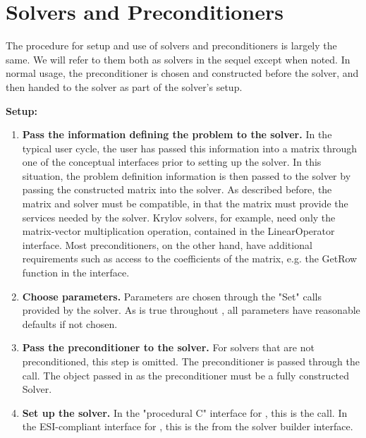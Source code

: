 \chapter{Solvers and Preconditioners}
\label{solvers}

The procedure for setup and use of solvers and preconditioners is largely
the same. We will refer to them both as solvers in the sequel except when noted. 
In normal usage, 
the preconditioner is chosen and constructed before the solver,
and then handed to the solver as part of the solver's setup.

{\bf Setup:}

\begin{enumerate}

\item
{\bf Pass the information defining the problem to the solver.} In the typical user cycle, the user
has passed this information into a matrix through one of the conceptual interfaces prior to
setting up the solver. In this situation, the problem definition information is then passed to
the solver by passing the constructed matrix into the solver. As described before, the matrix
and solver must be compatible, in that the matrix must provide the services needed by
the solver. Krylov solvers, for example, need only the matrix-vector multiplication operation,
contained in the LinearOperator interface. 
Most preconditioners, on the other hand, have additional requirements such as access to the
coefficients of the matrix, e.g. the GetRow function in the  interface.

\item
{\bf Choose parameters.} Parameters are chosen through the "Set" calls provided by the solver.
As is true throughout \hypre, all parameters have reasonable defaults if not chosen.

\item
{\bf Pass the preconditioner to the solver.} For solvers that are not preconditioned, this step
is omitted. The preconditioner is passed through the  call. The object passed
in as the preconditioner must be a fully constructed Solver.

\item
{\bf Set up the solver.} In the "procedural C" interface for \hypre, this is the  call.
In the ESI-compliant interface for \hypre, this is the  from the
solver builder interface.

\end{enumerate}


